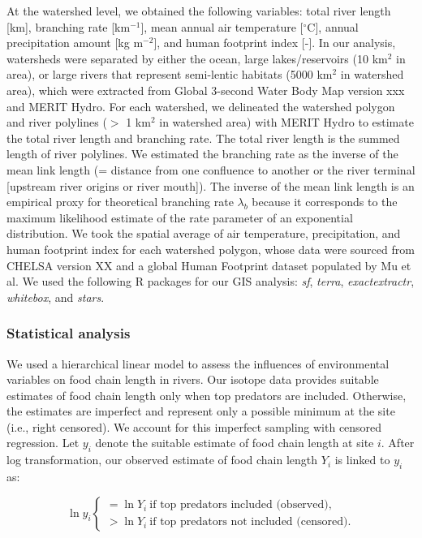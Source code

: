 \documentclass[11pt, class=article, crop=false]{standalone}
\begin{document}
At the watershed level, we obtained the following variables: total river length [km], branching rate [km$^{-1}$], mean annual air temperature [$^\circ$C], annual precipitation amount [kg m$^{-2}$], and human footprint index [-].
In our analysis, watersheds were separated by either the ocean, large lakes/reservoirs (10 km$^{2}$ in area), or large rivers that represent semi-lentic habitats (5000 km$^{2}$ in watershed area), which were extracted from Global 3-second Water Body Map version xxx and MERIT Hydro.
For each watershed, we delineated the watershed polygon and river polylines ($>$ 1 km$^2$ in watershed area) with MERIT Hydro to estimate the total river length and branching rate.
The total river length is the summed length of river polylines.
We estimated the branching rate as the inverse of the mean link length (= distance from one confluence to another or the river terminal [upstream river origins or river mouth]).
The inverse of the mean link length is an empirical proxy for theoretical branching rate $\lambda_b$ because it corresponds to the maximum likelihood estimate of the rate parameter of an exponential distribution.
We took the spatial average of air temperature, precipitation, and human footprint index for each watershed polygon, whose data were sourced from CHELSA version XX and a global Human Footprint dataset populated by Mu et al.
We used the following R packages for our GIS analysis: \textit{sf}, \textit{terra}, \textit{exactextractr}, \textit{whitebox}, and \textit{stars}.

\subsubsection{Statistical analysis}

We used a hierarchical linear model to assess the influences of environmental variables on food chain length in rivers.
Our isotope data provides suitable estimates of food chain length only when top predators are included.
Otherwise, the estimates are imperfect and represent only a possible minimum at the site (i.e., right censored).
We account for this imperfect sampling with censored regression.
Let $y_i$ denote the suitable estimate of food chain length at site $i$.
After log transformation, our observed estimate of food chain length $Y_i$ is linked to $y_i$ as:

\begin{equation}
    \ln y_i 
    \begin{cases}
        = \ln Y_i~\text{if top predators included (observed)},\\
        > \ln Y_i~\text{if top predators not included (censored).}
    \end{cases}
\end{equation}
\end{document}
